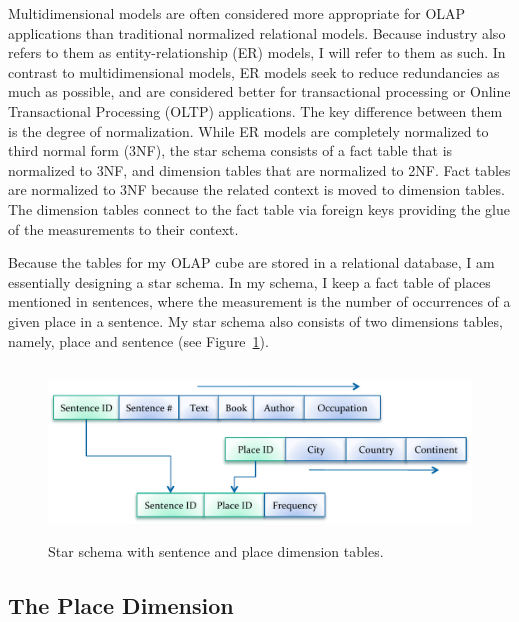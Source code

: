 Multidimensional models are often considered more appropriate for OLAP applications than traditional normalized relational models. Because industry also refers
to them as entity-relationship (ER) models, I will refer to them as such. In contrast to multidimensional models, ER models seek to reduce redundancies as much
as possible, and are considered better for transactional processing or Online Transactional Processing (OLTP) applications. The key difference between them is
the degree of normalization. While ER models are completely normalized to third normal form (3NF), the star schema consists of a fact table that is
normalized to 3NF, and dimension tables that are normalized to 2NF. Fact tables are normalized to 3NF because the related context is moved to dimension tables.
The dimension tables connect to the fact table via foreign keys providing the glue of the measurements to their context.

Because the tables for my OLAP cube are stored in a relational database, I am essentially designing a star schema. In my schema, I keep a fact table of places
mentioned in sentences, where the measurement is the number of occurrences of a given place in a sentence. My star schema also consists of two dimensions
tables, namely, place and sentence (see Figure~\ref{fig:figures_MyStarSchema}).

\begin{figure}[bp]
    \centering
        \includegraphics[height=1.8in]{figures/MyStarSchema.pdf}
    \caption{Star schema with sentence and place dimension tables.}
    \label{fig:figures_MyStarSchema}
\end{figure}

\subsection{The Place Dimension} %
\label{sub:the_place_dimension}

